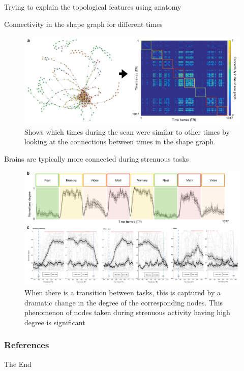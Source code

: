 \documentclass{beamer}
\begin{document}
\begin{frame}{Trying to explain the topological features using anatomy}
     
\end{frame}

\begin{frame}{Connectivity in the shape graph for different times}
    \begin{figure}
        \includegraphics[width = 0.8\linewidth]{fig5a.png}
        \caption{Shows which times during the scan were similar to other times by looking at the connections between times in the shape graph.}
    \end{figure}
\end{frame}

\begin{frame}{Brains are typically more connected during strenuous tasks}
    \begin{figure}
        \includegraphics[width = 0.8\linewidth]{fig5b.png}
        \caption{When there is a transition between tasks, this is captured by a dramatic change in the degree of the corresponding nodes. This phenomenon of nodes taken during strenuous activity having high degree is significant}
    \end{figure}
\end{frame}

\begin{frame}{}
    
\end{frame}

\begin{frame}{}
    
\end{frame}

\begin{frame}[allowframebreaks]
\frametitle{References}
\printbibliography
\end{frame}


\begin{frame}
\Huge{\centerline{The End}}
\end{frame}

\end{document}
